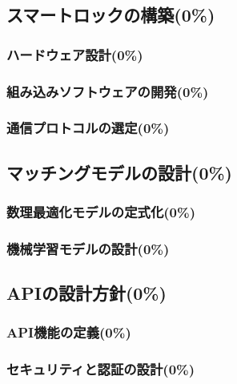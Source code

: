   \subsection{スマートロックの構築(0\%)}
    \label{sec:スマートロックの構築}
      \par 
      
      \subsubsection{ハードウェア設計(0\%)}
        \label{sec:ハードウェア設計}
          \par
          
      \subsubsection{組み込みソフトウェアの開発(0\%)}
        \label{sec:組み込みソフトウェアの開発}
          \par
          
      \subsubsection{通信プロトコルの選定(0\%)}
        \label{sec:通信プロトコルの選定}
          \par
          
  \subsection{マッチングモデルの設計(0\%)}
    \label{sec:マッチングモデルの設計}
      \par
      
      \subsubsection{数理最適化モデルの定式化(0\%)}
        \label{sec:数理最適化モデルの定式化}
          \par
          
      \subsubsection{機械学習モデルの設計(0\%)}
        \label{sec:機械学習モデルの設計}
          \par

  \subsection{APIの設計方針(0\%)}
    \label{sec:APIの設計方針}
      \par
      
      \subsubsection{API機能の定義(0\%)}
        \label{sec:API機能の定義}
          \par
          
      \subsubsection{セキュリティと認証の設計(0\%)}
        \label{sec:セキュリティと認証の設計}
          \par

